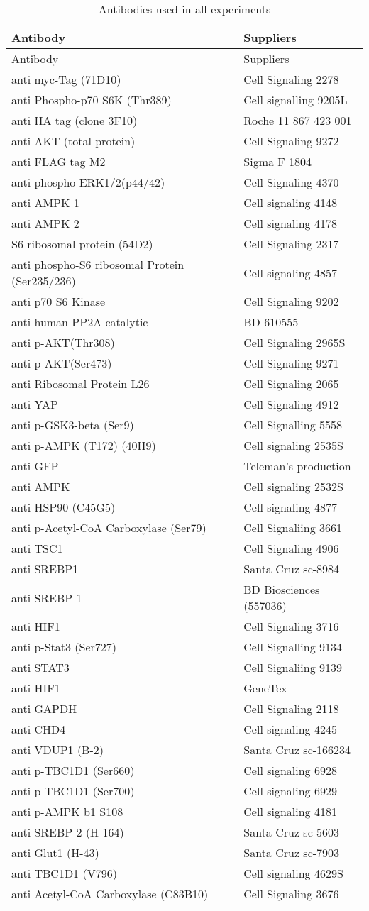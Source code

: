 \begin{longtable}{ll}
\caption[Antibody list]{Antibodies used in all experiments}\label{tab:tab3}\tabularnewline
\toprule
\multicolumn{1}{l}{Antibody}&\multicolumn{1}{l}{Suppliers}\tabularnewline
\midrule
\endfirsthead

\multicolumn{1}{l}{Antibody}&\multicolumn{1}{l}{Suppliers}\tabularnewline
\midrule
\endhead
\hline
\endfoot
anti myc-Tag (71D10)&Cell Signaling 2278\tabularnewline
anti Phospho-p70 S6K (Thr389)&Cell signalling 9205L\tabularnewline
anti HA tag (clone 3F10)&Roche 11 867 423 001\tabularnewline
anti AKT (total protein)&Cell Signaling 9272\tabularnewline
anti FLAG tag M2&Sigma F 1804\tabularnewline
anti phospho-ERK1/2(p44/42)&Cell Signaling 4370\tabularnewline
anti AMPK \textbeta{}1&Cell signaling 4148\tabularnewline
anti AMPK \textbeta{}2&Cell signaling 4178\tabularnewline
S6 ribosomal protein (54D2)&Cell Signaling 2317\tabularnewline
anti phospho-S6 ribosomal Protein (Ser235/236)&Cell signaling 4857\tabularnewline
anti p70 S6 Kinase&Cell Signaling 9202\tabularnewline
anti human PP2A catalytic&BD 610555\tabularnewline
anti p-AKT(Thr308)&Cell Signaling 2965S\tabularnewline
anti p-AKT(Ser473)&Cell Signaling 9271\tabularnewline
anti Ribosomal Protein L26&Cell Signaling 2065\tabularnewline
anti YAP&Cell Signaling 4912\tabularnewline
anti p-GSK3-beta (Ser9)&Cell Signalling 5558\tabularnewline
anti p-AMPK \textalpha{} (T172) (40H9)&Cell signaling 2535S\tabularnewline
anti GFP&Teleman's production\tabularnewline
anti AMPK\textalpha{}&Cell signaling 2532S\tabularnewline
anti HSP90 (C45G5)&Cell signaling 4877\tabularnewline
anti p-Acetyl-CoA Carboxylase (Ser79)&Cell Signaliing 3661\tabularnewline
anti TSC1&Cell Signaling 4906\tabularnewline
anti SREBP1&Santa Cruz sc-8984\tabularnewline
anti SREBP-1&BD Biosciences (557036)\tabularnewline
anti HIF1\textalpha{}&Cell Signaling 3716\tabularnewline
anti p-Stat3 (Ser727)&Cell Signalling 9134\tabularnewline
anti STAT3&Cell Signaliing 9139\tabularnewline
anti HIF1\textalpha{}&GeneTex\tabularnewline
anti GAPDH&Cell Signaling 2118\tabularnewline
anti CHD4&Cell signaling 4245\tabularnewline
anti VDUP1 (B-2)&Santa Cruz sc-166234\tabularnewline
anti p-TBC1D1 (Ser660)&Cell signaling 6928\tabularnewline
anti p-TBC1D1 (Ser700)&Cell signaling 6929\tabularnewline
anti p-AMPK b1 S108&Cell signaling 4181\tabularnewline
anti SREBP-2 (H-164)&Santa Cruz sc-5603\tabularnewline
anti Glut1 (H-43)&Santa Cruz sc-7903\tabularnewline
anti TBC1D1 (V796)&Cell signaling 4629S\tabularnewline
anti Acetyl-CoA Carboxylase (C83B10)&Cell Signaling 3676\tabularnewline
\bottomrule
\end{longtable}


